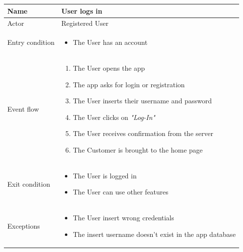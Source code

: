 \begin{table}[H]
    \begin{tabu} to \textwidth {|X|X[4]|}
        \hline
        Name            & User logs in           \\ \hline
        Actor           & Registered User        \\ \hline
        Entry condition & \begin{itemize}
            \item The User has an account
        \end{itemize} \\ \hline
        Event flow      & \begin{enumerate}
            \item The User opens the app
            \item The app asks for login or registration
            \item The User inserts their username and password
            \item The User clicks on \emph{"Log-In"}
            \item The User receives confirmation from the server
            \item The Customer is brought to the home page
        \end{enumerate} \\ \hline
        Exit condition  & \begin{itemize}
            \item The User is logged in
            \item The User can use other features
        \end{itemize} \\ \hline
        Exceptions      & \begin{itemize}
            \item The User insert wrong credentials
            \item The insert username doesn't exist in the app database
        \end{itemize} \\ \hline
    \end{tabu}
\end{table}

